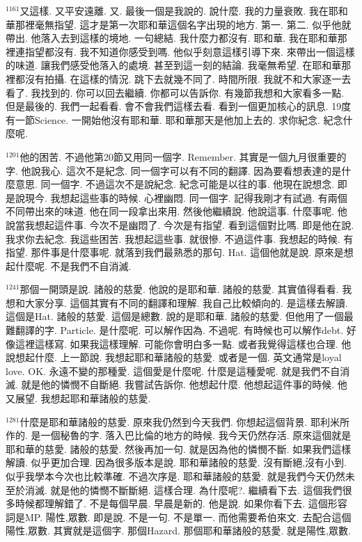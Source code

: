 \documentclass{book}
\begin{document}
$^{1161}$又這樣.
又平安遠離.
又.
最後一個是我說的.
說什麼.
我的力量衰敗.
我在耶和華那裡毫無指望.
這才是第一次耶和華這個名字出現的地方.
第一.
第二.
似乎他就帶出.
他落入去到這樣的境地.
一句總結.
我什麼力都沒有.
耶和華.
我在耶和華那裡連指望都沒有.
我不知道你感受到嗎.
他似乎刻意這樣引導下來.
來帶出一個這樣的味道.
讓我們感受他落入的處境.
甚至到這一刻的結論.
我毫無希望.
在耶和華那裡都沒有拍攝.
在這樣的情況.
跳下去就幾不同了.
時間所限.
我就不和大家逐一去看了.
我找到的.
你可以回去繼續.
你都可以告訴你.
有幾節我想和大家看多一點.
但是最後的.
我們一起看看.
會不會我們這樣去看.
看到一個更加核心的訊息.
19度有一節Science.
一開始他沒有耶和華.
耶和華那天是他加上去的.
求你紀念.
紀念什麼呢.

$^{1201}$他的困苦.
不過他第20節又用同一個字.
Remember.
其實是一個九月很重要的字.
他說我心.
這次不是紀念.
同一個字可以有不同的翻譯.
因為要看想表達的是什麼意思.
同一個字.
不過這次不是說紀念.
紀念可能是以往的事.
他現在說想念.
即是說現今.
我想起這些事的時候.
心裡幽悶.
同一個字.
記得我剛才有試過.
有兩個不同帶出來的味道.
他在同一段拿出來用.
然後他繼續說.
他說這事.
什麼事呢.
他說當我想起這件事.
今次不是幽悶了.
今次是有指望.
看到這個對比嗎.
即是他在說.
我求你去紀念.
我這些困苦.
我想起這些事.
就很慘.
不過這件事.
我想起的時候.
有指望.
那件事是什麼事呢.
就落到我們最熟悉的那句.
Hat.
這個他就是說.
原來是想起什麼呢.
不是我們不自消滅.

$^{1241}$那個一開頭是說.
諸般的慈愛.
他說的是耶和華.
諸般的慈愛.
其實值得看看.
我想和大家分享.
這個其實有不同的翻譯和理解.
我自己比較傾向的.
是這樣去解讀.
這個是Hat.
諸般的慈愛.
這個是總數.
說的是耶和華.
諸般的慈愛.
但他用了一個最難翻譯的字.
Particle.
是什麼呢.
可以解作因為.
不過呢.
有時候也可以解作debt.
好像這裡這樣寫.
如果我這樣理解.
可能你會明白多一點.
或者我覺得這樣也合理.
他說想起什麼.
上一節說.
我想起耶和華諸般的慈愛.
或者是一個.
英文通常是loyal love.
OK.
永遠不變的那種愛.
這個愛是什麼呢.
什麼是這種愛呢.
就是我們不自消滅.
就是他的憐憫不自斷絕.
我嘗試告訴你.
他想起什麼.
他想起這件事的時候.
他又展望.
我想起耶和華諸般的慈愛.

$^{1281}$什麼是耶和華諸般的慈愛.
原來我仍然到今天我們.
你想起這個背景.
耶利米所作的.
是一個秘魯的字.
落入巴比倫的地方的時候.
我今天仍然存活.
原來這個就是耶和華的慈愛.
諸般的慈愛.
然後再加一句.
就是因為他的憐憫不斷.
如果我們這樣解讀.
似乎更加合理.
因為很多版本是說.
耶和華諸般的慈愛.
沒有斷絕,沒有小到.
似乎我學本今次也比較準確.
不過次序是.
耶和華諸般的慈愛.
就是我們今天仍然未至於消滅.
就是他的憐憫不斷斷絕.
這樣合理.
為什麼呢?.
繼續看下去.
這個我們很多時候都理解錯了.
不是每個早晨.
早晨是新的.
他是說.
如果你看下去.
這個形容詞是MP.
陽性,眾數.
即是說.
不是一句.
不是單一.
而他需要希伯來文.
去配合這個陽性,眾數.
其實就是這個字.
那個Hazard.
那個耶和華諸般的慈愛.
就是陽性,眾數.
\end{document}
